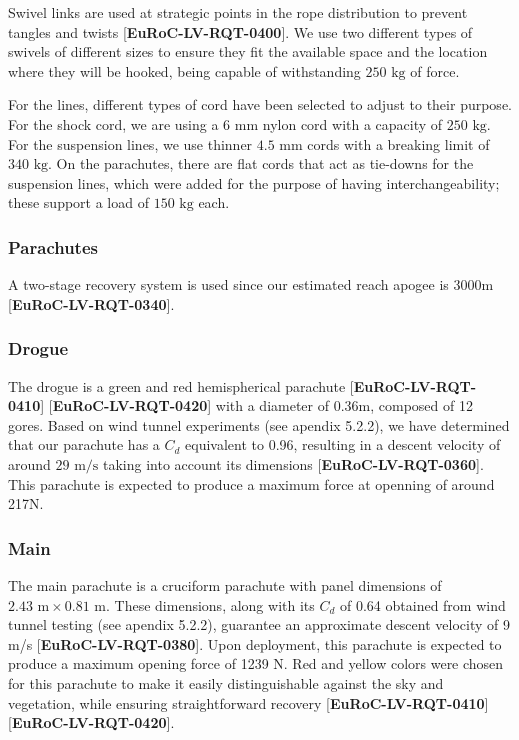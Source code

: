 \documentclass[11pt, a4paper]{article} %
\newcommand{\req}[1]{[\textcolor{EtseNavy}{\textbf{#1}}]}
\begin{document}
Swivel links are used at strategic points in the rope distribution to prevent tangles and twists \req{EuRoC-LV-RQT-0400}. We use two different types of swivels of different sizes to ensure they fit the available space and the location where they will be hooked, being capable of withstanding $250\text{ kg}$ of force.

For the lines, different types of cord have been selected to adjust to their purpose. For the shock cord, we are using a $6\text{ mm}$ nylon cord with a capacity of $250\text{ kg}$. For the suspension lines, we use thinner $4.5\text{ mm}$ cords with a breaking limit of $340\text{ kg}$. On the parachutes, there are flat cords that act as tie-downs for the suspension lines, which were added for the purpose of having interchangeability; these support a load of $150\text{ kg}$ each.

\subsubsection{Parachutes}
A two-stage recovery system is used since our estimated reach apogee is 3000m \req{EuRoC-LV-RQT-0340}.

\subsubsection*{Drogue}
 The drogue is a green and red hemispherical parachute \req{EuRoC-LV-RQT-0410} \req{EuRoC-LV-RQT-0420} with a diameter of 0.36m, composed of 12 gores. Based on wind tunnel experiments (see apendix 5.2.2), we have determined that our parachute has a $C_d$ equivalent to 0.96, resulting in a descent velocity of around $29\text{ m/s}$ taking into account its dimensions \req{EuRoC-LV-RQT-0360}. This parachute is expected to produce a maximum force at openning of around 217N.

\subsubsection*{Main}
The main parachute is a cruciform parachute with panel dimensions of $2.43\text{ m} \times 0.81\text{ m}$. These dimensions, along with its $C_d$ of 0.64 obtained from wind tunnel testing (see apendix 5.2.2), guarantee an approximate descent velocity of 9 m/s  \req{EuRoC-LV-RQT-0380}. Upon deployment, this parachute is expected to produce a maximum opening force of 1239 N. Red and yellow colors were chosen for this parachute to make it easily distinguishable against the sky and vegetation, while ensuring straightforward recovery \req{EuRoC-LV-RQT-0410} \req{EuRoC-LV-RQT-0420}.
\end{document}
